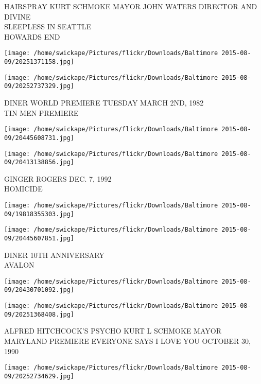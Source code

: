 \documentclass[10pt,letterpaper]{article}
\begin{document}
HAIRSPRAY KURT SCHMOKE MAYOR JOHN WATERS DIRECTOR AND DIVINE\\
SLEEPLESS IN SEATTLE\\
HOWARDS END\\
\pagebreak

\texttt{[image: /home/swickape/Pictures/flickr/Downloads/Baltimore 2015-08-09/20251371158.jpg]}

\vspace{0.25in}
\texttt{[image: /home/swickape/Pictures/flickr/Downloads/Baltimore 2015-08-09/20252737329.jpg]}

DINER WORLD PREMIERE TUESDAY MARCH 2ND, 1982\\
TIN MEN PREMIERE\\
\pagebreak

\texttt{[image: /home/swickape/Pictures/flickr/Downloads/Baltimore 2015-08-09/20445608731.jpg]}

\vspace{0.25in}
\texttt{[image: /home/swickape/Pictures/flickr/Downloads/Baltimore 2015-08-09/20413138856.jpg]}

GINGER ROGERS DEC. 7, 1992\\
HOMICIDE\\
\pagebreak

\texttt{[image: /home/swickape/Pictures/flickr/Downloads/Baltimore 2015-08-09/19818355303.jpg]}

\vspace{0.25in}
\texttt{[image: /home/swickape/Pictures/flickr/Downloads/Baltimore 2015-08-09/20445607851.jpg]}

DINER 10TH ANNIVERSARY\\
AVALON\\
\pagebreak

\texttt{[image: /home/swickape/Pictures/flickr/Downloads/Baltimore 2015-08-09/20430701092.jpg]}

\vspace{0.25in}
\texttt{[image: /home/swickape/Pictures/flickr/Downloads/Baltimore 2015-08-09/20251368408.jpg]}

ALFRED HITCHCOCK'S PSYCHO KURT L SCHMOKE MAYOR\\
MARYLAND PREMIERE EVERYONE SAYS I LOVE YOU OCTOBER 30, 1990\\
\pagebreak

\texttt{[image: /home/swickape/Pictures/flickr/Downloads/Baltimore 2015-08-09/20252734629.jpg]}
\end{document}
